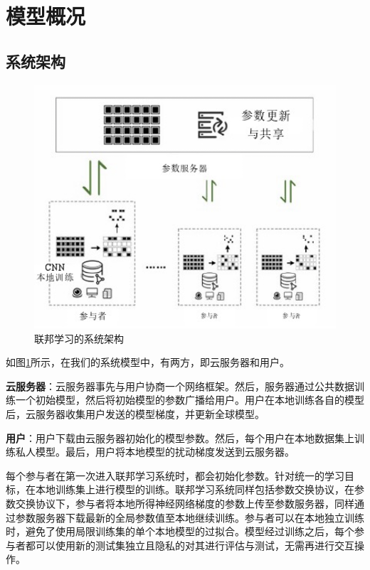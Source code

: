 \section{模型概况}

\subsection{系统架构}

\begin{figure}[!hbt]
\centering
	\includegraphics[scale=0.7]{fig2/C3/联邦学习系统架构}%
	\caption{联邦学习的系统架构}
	\label{fig:联邦学习的系统架构}	
\end{figure}

如图\ref{fig:联邦学习的系统架构}所示，在我们的系统模型中，有两方，即云服务器和用户。

\textbf{云服务器}：云服务器事先与用户协商一个网络框架。然后，服务器通过公共数据训练一个初始模型，然后将初始模型的参数广播给用户。用户在本地训练各自的模型后，云服务器收集用户发送的模型梯度，并更新全球模型。

\textbf{用户}：用户下载由云服务器初始化的模型参数。然后，每个用户在本地数据集上训练私人模型。最后，用户将本地模型的扰动梯度发送到云服务器。

每个参与者在第一次进入联邦学习系统时，都会初始化参数。针对统一的学习目标，在本地训练集上进行模型的训练。联邦学习系统同样包括参数交换协议，在参数交换协议下，参与者将本地所得神经网络梯度的参数上传至参数服务器，同样通过参数服务器下载最新的全局参数值至本地继续训练。参与者可以在本地独立训练时，避免了使用局限训练集的单个本地模型的过拟合。模型经过训练之后，每个参与者都可以使用新的测试集独立且隐私的对其进行评估与测试，无需再进行交互操作。 

